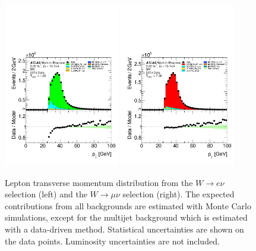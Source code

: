 \begin{figure}[htbp]
\centering
\includegraphics[width=0.45\textwidth]{figures/SR/dataMc-lep_0_pt-SR-bkgQCD-el.pdf}
\includegraphics[width=0.45\textwidth]{figures/SR/dataMc-lep_0_pt-SR-bkgQCD-mu.pdf}
\caption{
Lepton transverse momentum distribution from the $W \rightarrow e\nu$ selection (left) and the $W \rightarrow \mu\nu$ selection (right). 
The expected contributions from all backgrounds are estimated with Monte Carlo simulations, except for the multijet background which is estimated with a data-driven method. 
Statistical uncertainties are shown on the data points.
Luminosity uncertainties are not included.
}
\label{fig:SR_lep_0_pt}
\end{figure}

